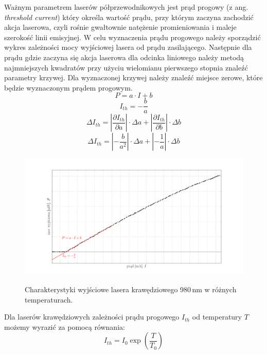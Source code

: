 \documentclass[a4paper, portrait,12pt]{report}
\begin{document}
Ważnym parametrem laserów półprzewodnikowych jest prąd progowy (z ang. \textit{threshold
current}) który określa wartość prądu, przy którym zaczyna zachodzić akcja laserowa, czyli
rośnie gwałtownie natężenie promieniowania i maleje szerokość linii emisyjnej. W celu wyznaczenia prądu progowego należy sporządzić wykres zależności mocy wyjściowej lasera od prądu zasilającego. Następnie dla prądu gdzie zaczyna się akcja laserowa dla odcinka liniowego należy metodą najmniejszych kwadratów przy użyciu wielomianu pierwszego stopnia znaleźć parametry krzywej. Dla wyznaczonej krzywej należy znaleźć miejsce zerowe, które będzie wyznaczonym prądem progowym.
\begin{equation}
P = a \cdot I + b
\end{equation}
\begin{equation}
I_{th} = -\frac{b}{a}
\end{equation}
\begin{equation}
\Delta I_{th} = \left\lvert \frac{\partial I_{th}}{\partial a} \right\rvert \cdot \Delta a + \left\lvert \frac{\partial I_{th}}{\partial b} \right\rvert \cdot \Delta b
\end{equation}
\begin{equation}
\Delta I_{th} = \left\lvert -\frac{b}{a^2} \right\rvert \cdot \Delta a + \left\lvert -\frac{1}{a} \right\rvert \cdot \Delta b 
\end{equation}
\begin{figure}
\center
  \includegraphics[scale=0.30]{plot_theory_i_th.png}
  \label{rys1}
  \caption{Charakterystyki wyjściowe lasera krawędziowego 980\,nm w różnych temperaturach. } 
\end{figure}
\newpage
Dla laserów krawędziowych zależności prądu progowego $I_{th}$ od temperatury $T$ możemy wyrazić za pomocą równania:
\begin{equation}
I_{th} = I_0 \exp \left( \frac{T}{T_0} \right)
\end{equation}
\end{document}
